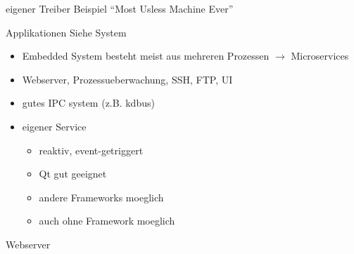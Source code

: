\begin{frame}{eigener Treiber}
	Beispiel ``Most Usless Machine Ever''
\end{frame}

\begin{frame}{Applikationen}
	Siehe System
	\begin{itemize}
		\item Embedded System besteht meist aus mehreren Prozessen $\rightarrow$ Microservices
		\item Webserver, Prozessueberwachung, SSH, FTP, UI
		\item gutes IPC system (z.B. kdbus)
		\item eigener Service
		\begin{itemize}
			\item reaktiv, event-getriggert
			\item Qt gut geeignet
			\item andere Frameworks moeglich
			\item auch ohne Framework moeglich
		\end{itemize}
	\end{itemize}
\end{frame}

\begin{frame}{Webserver}
\end{frame}